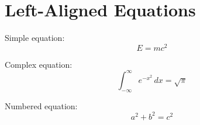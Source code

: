 \documentclass[fleqn]{article}
\begin{document}
\section*{Left-Aligned Equations}

Simple equation:
\[
E = mc^2
\]

Complex equation:
\[
\int_{-\infty}^{\infty} e^{-x^2} \, dx = \sqrt{\pi}
\]

Numbered equation:
\begin{equation}
a^2 + b^2 = c^2
\end{equation}
\end{document}
